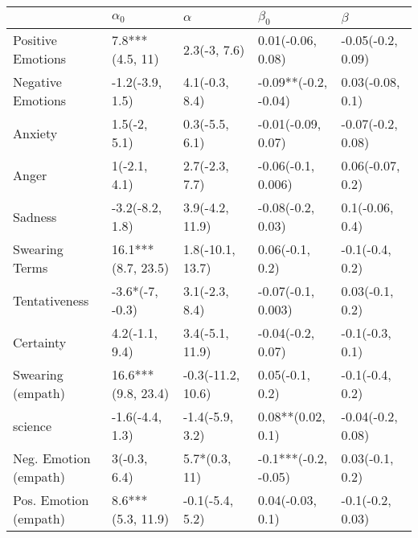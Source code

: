 \begin{tabular}{lllll}
\toprule
{} &          $\alpha_0$ &           $\alpha$ &             $\beta_0$ &            $\beta$ \\
\midrule
Positive Emotions     &     7.8***(4.5, 11) &       2.3(-3, 7.6) &     0.01(-0.06, 0.08) &  -0.05(-0.2, 0.09) \\
Negative Emotions     &     -1.2(-3.9, 1.5) &     4.1(-0.3, 8.4) &  -0.09**(-0.2, -0.04) &   0.03(-0.08, 0.1) \\
Anxiety               &        1.5(-2, 5.1) &     0.3(-5.5, 6.1) &    -0.01(-0.09, 0.07) &  -0.07(-0.2, 0.08) \\
Anger                 &        1(-2.1, 4.1) &     2.7(-2.3, 7.7) &    -0.06(-0.1, 0.006) &   0.06(-0.07, 0.2) \\
Sadness               &     -3.2(-8.2, 1.8) &    3.9(-4.2, 11.9) &     -0.08(-0.2, 0.03) &    0.1(-0.06, 0.4) \\
Swearing Terms        &  16.1***(8.7, 23.5) &   1.8(-10.1, 13.7) &       0.06(-0.1, 0.2) &    -0.1(-0.4, 0.2) \\
Tentativeness         &     -3.6*(-7, -0.3) &     3.1(-2.3, 8.4) &    -0.07(-0.1, 0.003) &    0.03(-0.1, 0.2) \\
Certainty             &      4.2(-1.1, 9.4) &    3.4(-5.1, 11.9) &     -0.04(-0.2, 0.07) &    -0.1(-0.3, 0.1) \\
Swearing (empath)     &  16.6***(9.8, 23.4) &  -0.3(-11.2, 10.6) &       0.05(-0.1, 0.2) &    -0.1(-0.4, 0.2) \\
science               &     -1.6(-4.4, 1.3) &    -1.4(-5.9, 3.2) &     0.08**(0.02, 0.1) &  -0.04(-0.2, 0.08) \\
Neg. Emotion (empath) &        3(-0.3, 6.4) &      5.7*(0.3, 11) &  -0.1***(-0.2, -0.05) &    0.03(-0.1, 0.2) \\
Pos. Emotion (empath) &   8.6***(5.3, 11.9) &    -0.1(-5.4, 5.2) &      0.04(-0.03, 0.1) &   -0.1(-0.2, 0.03) \\
\bottomrule
\end{tabular}

